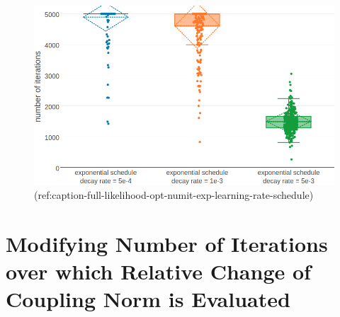 \documentclass[11pt,a4paper,twoside]{book}
\theoremstyle{definition}
\theoremstyle{definition}
\theoremstyle{remark}
\begin{document}
\begin{figure}

{\centering \includegraphics[width=0.9\linewidth]{img/full_likelihood/appendix/distribution_numiterations_against_exponential_learningrate_schedule} 

}

\caption{(ref:caption-full-likelihood-opt-numit-exp-learning-rate-schedule)}\label{fig:full-likelihood-opt-numit-exp-learning-rate-schedule}
\end{figure}

\section{Modifying Number of Iterations over which Relative Change of
Coupling Norm is
Evaluated}\label{modifying-number-of-iterations-over-which-relative-change-of-coupling-norm-is-evaluated}
\end{document}
